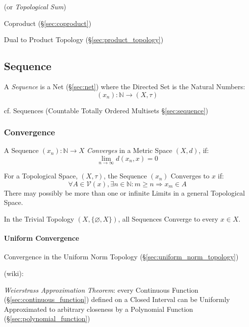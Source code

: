 (or \emph{Topological Sum})

Coproduct (\S\ref{sec:coproduct})

Dual to Product Topology (\S\ref{sec:product_topology})



\subsection{Sequence}\label{sec:sequence_topology}

A \emph{Sequence} is a Net (\S\ref{sec:net}) where the Directed Set is
the Natural Numbers:
\[
  (x_n) : \mathbb{N} \rightarrow (X,\tau)
\]

cf. Sequences (Countable Totally Ordered Multisets \S\ref{sec:sequence})



\subsubsection{Convergence}\label{sec:convergence}

A Sequence $(x_n) : \mathbb{N} \rightarrow X$ \emph{Converges} in a Metric
Space $(X,d)$, if:
\[
  \lim_{n \rightarrow \infty} d (x_n, x) = 0
\]

For a Topological Space, $(X,\tau)$, the Sequence $(x_n)$ Converges to
$x$ if:
\[
  \forall A \in \mathcal{V}(x), \exists n \in \mathbb{N}
  : m \geq n \Rightarrow x_m \in A
\]
There may possibly be more than one or infinite Limits in a general
Topological Space.

In the Trivial Topology $(X, \{\varnothing, X\})$, all Sequences
Converge to every $x \in X$.



\paragraph{Uniform Convergence}\label{sec:uniform_convergence}\hfill

Convergence in the Uniform Norm Topology (\S\ref{sec:uniform_norm_topology})

(wiki):

\emph{Weierstrass Approximation Theorem}: every Continuous Function
(\S\ref{sec:continuous_function}) defined on a Closed Interval can be Uniformly
Approximated to arbitrary closeness by a Polynomial Function
(\S\ref{sec:polynomial_function})

